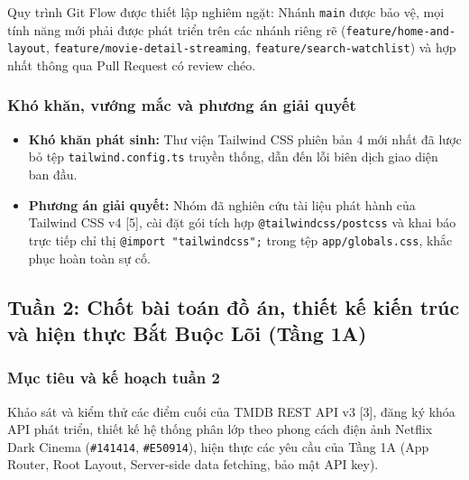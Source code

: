 \documentclass[13pt,a4paper]{extarticle}
\begin{document}
Quy trình Git Flow được thiết lập nghiêm ngặt: Nhánh \texttt{main} được bảo vệ, mọi tính năng mới phải được phát triển trên các nhánh riêng rẽ (\texttt{feature/home-and-layout}, \texttt{feature/movie-detail-streaming}, \texttt{feature/search-watchlist}) và hợp nhất thông qua Pull Request có review chéo.

\subsubsection{Khó khăn, vướng mắc và phương án giải quyết}
\begin{itemize}[noitemsep]
    \item \textbf{Khó khăn phát sinh:} Thư viện Tailwind CSS phiên bản 4 mới nhất đã lược bỏ tệp \texttt{tailwind.config.ts} truyền thống, dẫn đến lỗi biên dịch giao diện ban đầu.
    \item \textbf{Phương án giải quyết:} Nhóm đã nghiên cứu tài liệu phát hành của Tailwind CSS v4 [5], cài đặt gói tích hợp \texttt{@tailwindcss/postcss} và khai báo trực tiếp chỉ thị \texttt{@import "tailwindcss";} trong tệp \texttt{app/globals.css}, khắc phục hoàn toàn sự cố.
\end{itemize}

\subsection{Tuần 2: Chốt bài toán đồ án, thiết kế kiến trúc và hiện thực Bắt Buộc Lõi (Tầng 1A)}

\subsubsection{Mục tiêu và kế hoạch tuần 2}
Khảo sát và kiểm thử các điểm cuối của TMDB REST API v3 [3], đăng ký khóa API phát triển, thiết kế hệ thống phân lớp theo phong cách điện ảnh Netflix Dark Cinema (\texttt{\#141414}, \texttt{\#E50914}), hiện thực các yêu cầu của Tầng 1A (App Router, Root Layout, Server-side data fetching, bảo mật API key).
\end{document}
